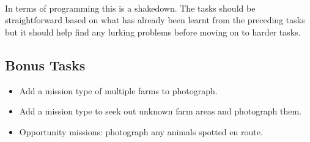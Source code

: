 \documentclass[11pt]{book}
\begin{document}
\paragraph{} In terms of programming this is a shakedown. The tasks should be
straightforward based on what has already been learnt from the preceding tasks
but it should help find any lurking problems before moving on to harder tasks.

\subsection{Bonus Tasks}

\begin{itemize}
\item Add a mission type of multiple farms to photograph.
\item Add a mission type to seek out unknown farm areas and photograph them.
\item Opportunity missions: photograph any animals spotted en route.
\end{itemize}

\clearpage
\end{document}
